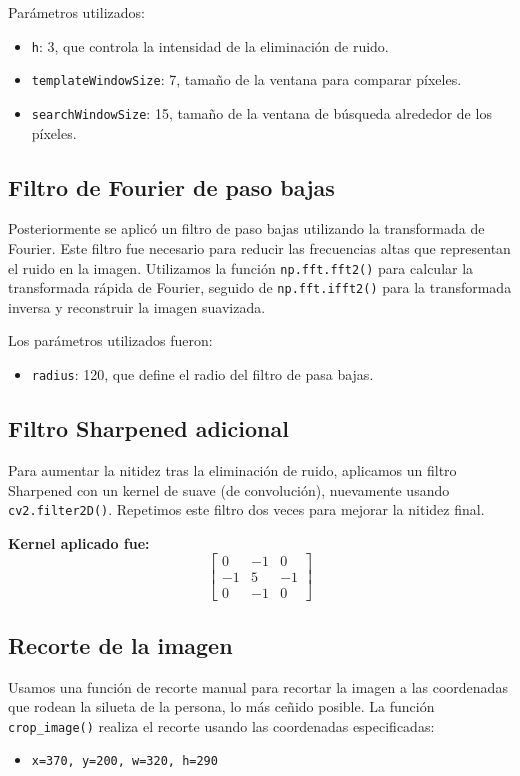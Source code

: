 \documentclass{article}
\begin{document}
Parámetros utilizados:
\begin{itemize}
    \item \texttt{h}: 3, que controla la intensidad de la eliminación de ruido.
    \item \texttt{templateWindowSize}: 7, tamaño de la ventana para comparar píxeles.
    \item \texttt{searchWindowSize}: 15, tamaño de la ventana de búsqueda alrededor de los píxeles.
\end{itemize}

\subsection{Filtro de Fourier de paso bajas}
Posteriormente se aplicó un filtro de paso bajas \cite{wsthub_fourier_transform} utilizando la transformada de Fourier. Este filtro fue necesario para reducir las frecuencias altas que representan el ruido en la imagen. Utilizamos la función \texttt{np.fft.fft2()} para calcular la transformada rápida de Fourier, seguido de \texttt{np.fft.ifft2()} para la transformada inversa y reconstruir la imagen suavizada.

Los parámetros utilizados fueron:
\begin{itemize}
    \item \texttt{radius}: 120, que define el radio del filtro de pasa bajas.
\end{itemize}

\subsection{Filtro Sharpened adicional}
Para aumentar la nitidez tras la eliminación de ruido, aplicamos un filtro Sharpened con un kernel de suave (de convolución), nuevamente usando \texttt{cv2.filter2D()}. Repetimos este filtro dos veces para mejorar la nitidez final.

\textbf{Kernel aplicado fue:}
\[
    \begin{bmatrix}
        0  & -1 & 0  \\
        -1 & 5  & -1 \\
        0  & -1 & 0
    \end{bmatrix}
\]

\subsection{Recorte de la imagen}
Usamos una función de recorte manual para recortar la imagen a las coordenadas que rodean la silueta de la persona, lo más ceñido posible. La función \texttt{crop\_image()} realiza el recorte usando las coordenadas especificadas:
\begin{itemize}
    \item \texttt{x=370, y=200, w=320, h=290}
\end{itemize}
\end{document}
